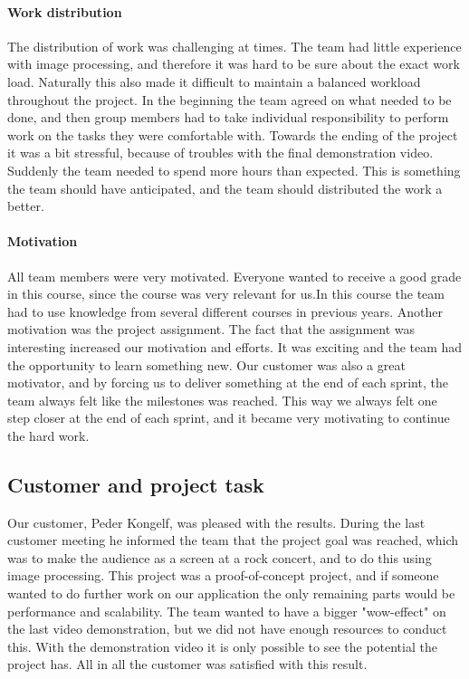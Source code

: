 \paragraph{Work distribution}
The distribution of work was challenging at times. 
The team had little experience with image processing, and therefore it was hard to be sure about the exact work load. Naturally this also made it difficult to maintain a balanced workload throughout the project. 
In the beginning the team agreed on what needed to be done, and then group members had to take individual responsibility to perform work on the tasks they were comfortable with. 
Towards the ending of the project it was a bit stressful, because of troubles with the final demonstration video. Suddenly the team needed to spend more hours than expected. This is something the team should have anticipated, and the team should distributed the work a better.

\paragraph{Motivation}
All team members were very motivated. Everyone wanted to receive a good grade in this course, since the course was very relevant for us.In this course the team had to use knowledge from several different courses in previous years. Another motivation was the project assignment. The fact that the assignment was interesting increased our motivation and efforts. It was exciting and the team had the opportunity to learn something new. Our customer was also a great motivator, and by forcing us to deliver something at the end of each sprint, the team always felt like the milestones was reached. This way we always felt one step closer at the end of each sprint, and it became very motivating to continue the hard work. 

\subsection{Customer and project task} 
Our customer, Peder Kongelf, was pleased with the results. During the last customer meeting he informed the team that the project goal was reached, which was to make the audience as a screen at a rock concert, and to do this using image processing.
This project was a proof-of-concept project, and if someone wanted to do further work on our application the only remaining parts would be performance and scalability. 
The team wanted to have a bigger "wow-effect" on the last video demonstration, but we did not have enough resources to conduct this. With the demonstration video it is only possible to see the potential the project has. All in all the customer was satisfied with this result. 

